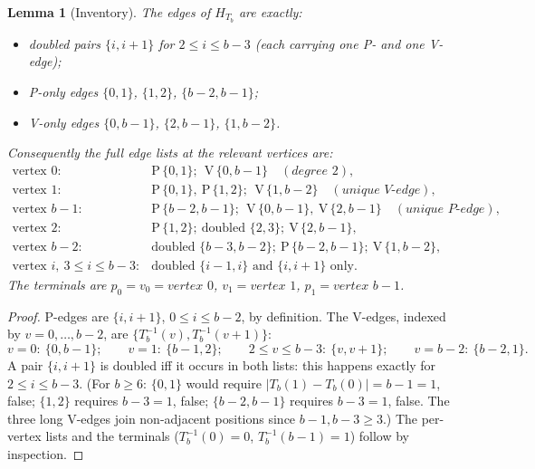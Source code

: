 \documentclass[11pt]{article}
\newtheorem{lemma}[theorem]{Lemma}
\theoremstyle{definition}
\newcommand{\inv}[1]{#1^{-1}}
\begin{document}
\begin{lemma}[Inventory]\label{lem:inventory}
The edges of $H_{T_b}$ are exactly:
\begin{itemize}
\item \emph{doubled pairs} $\{i, i+1\}$ for $2 \le i \le b-3$ (each carrying one P-
and one V-edge);
\item \emph{P-only edges} $\{0,1\}$, $\{1,2\}$, $\{b-2, b-1\}$;
\item \emph{V-only edges} $\{0, b-1\}$, $\{2, b-1\}$, $\{1, b-2\}$.
\end{itemize}
Consequently the full edge lists at the relevant vertices are:
\[
\begin{array}{ll}
\text{vertex } 0: & \mathrm P\,\{0,1\};\ \ \mathrm V\,\{0,b{-}1\} \quad
(\textit{degree } 2),\\[2pt]
\text{vertex } 1: & \mathrm P\,\{0,1\},\ \mathrm P\,\{1,2\};\ \ \mathrm V\,\{1,b{-}2\}
\quad (\textit{unique V-edge}),\\[2pt]
\text{vertex } b{-}1: & \mathrm P\,\{b{-}2,b{-}1\};\ \ \mathrm V\,\{0,b{-}1\},\
\mathrm V\,\{2,b{-}1\} \quad (\textit{unique P-edge}),\\[2pt]
\text{vertex } 2: & \mathrm P\,\{1,2\};\ \text{doubled } \{2,3\};\
\mathrm V\,\{2,b{-}1\},\\[2pt]
\text{vertex } b{-}2: & \text{doubled } \{b{-}3,b{-}2\};\ \mathrm P\,\{b{-}2,b{-}1\};\
\mathrm V\,\{1,b{-}2\},\\[2pt]
\text{vertex } i,\ 3 \le i \le b-3: & \text{doubled } \{i{-}1,i\} \text{ and }
\{i,i{+}1\} \text{ only}.
\end{array}
\]
The terminals are $p_0 = v_0 = \textit{vertex } 0$, $v_1 = \textit{vertex } 1$,
$p_1 = \textit{vertex } b-1$.
\end{lemma}

\begin{proof}
P-edges are $\{i, i+1\}$, $0 \le i \le b-2$, by definition. The V-edges, indexed by
$v = 0, \dots, b-2$, are $\{\inv{T_b}(v), \inv{T_b}(v+1)\}$:
\[
v = 0:\ \{0, b{-}1\}; \qquad
v = 1:\ \{b{-}1, 2\}; \qquad
2 \le v \le b-3:\ \{v, v{+}1\}; \qquad
v = b{-}2:\ \{b{-}2, 1\}.
\]
A pair $\{i, i+1\}$ is doubled iff it occurs in both lists: this happens exactly for
$2 \le i \le b-3$. (For $b \ge 6$: $\{0,1\}$ would require
$|T_b(1) - T_b(0)| = b-1 = 1$, false; $\{1,2\}$ requires $b - 3 = 1$, false;
$\{b-2,b-1\}$ requires $b-3 = 1$, false. The three long V-edges join non-adjacent
positions since $b - 1, b - 3 \ge 3$.) The per-vertex lists and the terminals
($\inv{T_b}(0) = 0$, $\inv{T_b}(b-1) = 1$) follow by inspection.
\end{proof}
\end{document}
